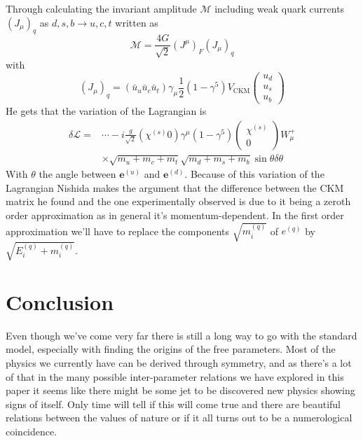 \documentclass[twoside,twocolumn,11pt]{article} %
\begin{document}
Through calculating the invariant amplitude $\mathcal{M}$ including weak quark currents $(J_\mu)_q$ as $d,s,b\rightarrow u,c,t$ written as 
\begin{equation}
	\mathcal{M}=\frac{4 G}{\sqrt{2}}\left(J^{\mu}\right)_{F}\left(J_{\mu}\right)_{q}
\end{equation}
with
\begin{equation}
	\left(J_{\mu}\right)_{q}=\left(\bar{u}_{u} \bar{u}_{c} \bar{u}_{t}\right) \gamma_{\mu} \frac{1}{2}\left(1-\gamma^{5}\right) V_{\mathrm{CKM}}\left(\begin{array}{l}
		u_{d} \\
		u_{s} \\
		u_{b}
	\end{array}\right)
\end{equation}
He gets that the variation of the Lagrangian is 
\begin{align}
	\delta \mathcal{L}=& \cdots-i \frac{g}{\sqrt{2}}\left(\chi^{(s)} 0\right) \gamma^{\mu}\left(1-\gamma^{5}\right)\left(\begin{array}{c}
		\chi^{(s)} \\
		0
	\end{array}\right) W_{\mu}^{+} \\
	& \times \sqrt{m_{u}+m_{c}+m_{t}} \sqrt{m_{d}+m_{s}+m_{b}} \sin \theta \delta \theta
\end{align}
With $\theta$ the angle between $\boldsymbol{e}^{(u)}$ and $\boldsymbol{e}^{(d)}$. Because of this variation of the Lagrangian Nishida makes the argument that the difference between the CKM matrix he found and the one experimentally observed is due to it being a zeroth order approximation as in general it's momentum-dependent. In the first order approximation we'll have to replace the components $\sqrt{m_{i}^{(q)}}$ of $e^{(q)}$ by $\sqrt{E_{i}^{(q)}+m_{i}^{(q)}}$.
\section*{Conclusion}
Even though we've come very far there is still a long way to go with the standard model, especially with finding the origins of the free parameters. Most of the physics we currently have can be derived through symmetry, and as there's a lot of that in the many possible inter-parameter relations we have explored in this paper it seems like there might be some jet to be discovered new physics showing signs of itself. Only time will tell if this will come true and there are beautiful relations between the values of nature or if it all turns out to be a numerological coincidence.



\end{document}
